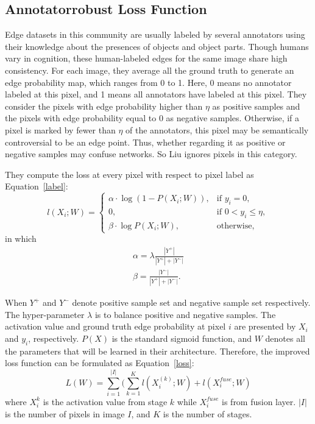\documentclass[10pt,twocolumn,letterpaper]{article}
\begin{document}
\subsection{Annotatorrobust Loss Function}

Edge datasets in this community are usually labeled by several annotators using their knowledge about the presences of objects and object parts. Though humans vary in cognition, these human-labeled edges for the same image share high consistency. For each image, they average all the ground truth to generate an edge probability map, which ranges from 0 to 1. Here, 0 means no annotator labeled at this pixel, and 1 means all annotators have labeled at this pixel. They consider the pixels with edge probability higher than $\eta$ as positive samples and the pixels with edge probability equal to 0 as negative samples. Otherwise, if a pixel is marked by fewer than $\eta$ of the annotators, this pixel may be semantically controversial to be an edge point. Thus, whether regarding it as positive or negative samples may confuse networks. So Liu ignores pixels in this category.

They compute the loss at every pixel with respect to pixel label as Equation~\ref{label}:
\begin{equation}
l(X_i;W)=
\begin{cases}
\alpha\cdot\log(1-P(X_i;W)), & \mbox{if } y_i=0, \\
0, & \mbox{if } 0<y_i\leq\eta, \\
\beta\cdot\log P(X_i;W), & \mbox{otherwise},
\end{cases}      \label{label}
\end{equation}
in which 
\begin{align}
\alpha=\lambda \frac{|Y^+|}{|Y^+|+|Y^-|} \label{eq1} \\
\beta=\frac{|Y^-|}{|Y^+|+|Y^-|}. \label{eq2}
\end{align}

When $Y^+$ and $Y^-$ denote positive sample set and negative sample set respectively. The hyper-parameter $\lambda$ is to balance positive and negative samples. The activation value and ground truth edge probability at pixel $i$ are presented by $X_i$ and $y_i$, respectively. $P(X)$ is the standard sigmoid function, and $W$ denotes all the parameters that will be learned in their architecture. Therefore, the improved loss function can be formulated as Equation~\ref{loss}:
\begin{equation}
L(W)=\sum_{i=1}^{|I|}(\sum_{k=1}^{K}l(X_i^{(k)};W)+l(X_i^{fuse};W)  \label{loss}
\end{equation}
where $X_i^{k}$ is the activation value from stage $k$ while $X_i^{fuse}$ is from fusion layer. $|I|$ is the number of pixels in image $I$, and $K$ is the number of stages.
\end{document}
